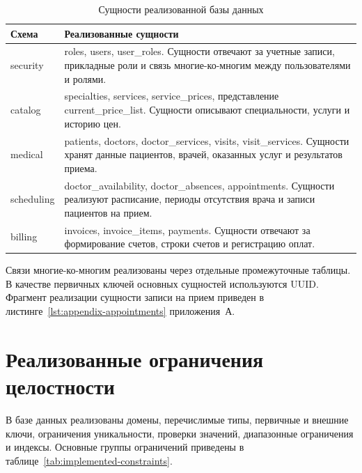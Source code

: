 \begin{table}[H]
    \centering
    \caption{Сущности реализованной базы данных}
    \label{tab:implemented-entities}
    \footnotesize
    \renewcommand{\arraystretch}{1.08}
    \begin{tabularx}{\textwidth}{|>{\raggedright\arraybackslash}p{3.5cm}|>{\raggedright\arraybackslash}X|}
        \hline
        Схема & Реализованные сущности \tabularnewline
        \hline
        security & roles, users, user\_roles. Сущности отвечают за учетные записи, прикладные роли и связь многие-ко-многим между пользователями и ролями. \tabularnewline
        \hline
        catalog & specialties, services, service\_prices, представление current\_price\_list. Сущности описывают специальности, услуги и историю цен. \tabularnewline
        \hline
        medical & patients, doctors, doctor\_services, visits, visit\_services. Сущности хранят данные пациентов, врачей, оказанных услуг и результатов приема. \tabularnewline
        \hline
        scheduling & doctor\_availability, doctor\_absences, appointments. Сущности реализуют расписание, периоды отсутствия врача и записи пациентов на прием. \tabularnewline
        \hline
        billing & invoices, invoice\_items, payments. Сущности отвечают за формирование счетов, строки счетов и регистрацию оплат. \tabularnewline
        \hline
    \end{tabularx}
\end{table}
\normalsize

Связи многие-ко-многим реализованы через отдельные промежуточные таблицы. В качестве первичных ключей основных сущностей используются UUID. Фрагмент реализации сущности записи на прием приведен в листинге~\ref{lst:appendix-appointments} приложения~А.

\section{Реализованные ограничения целостности}

В базе данных реализованы домены, перечислимые типы, первичные и внешние ключи, ограничения уникальности, проверки значений, диапазонные ограничения и индексы. Основные группы ограничений приведены в таблице~\ref{tab:implemented-constraints}.

